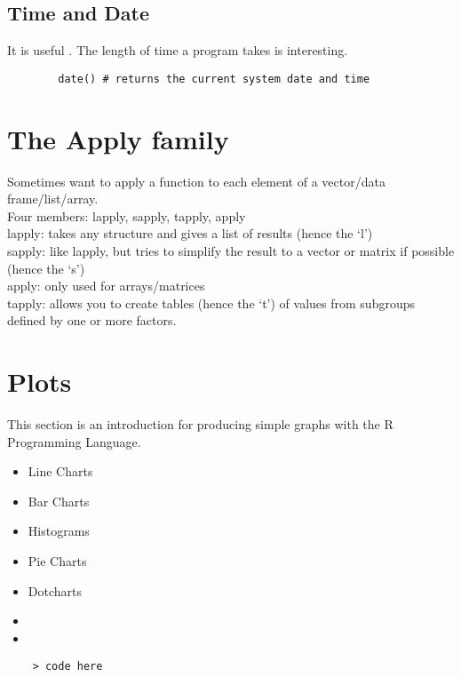 \documentclass[a4paper,12pt]{article}
\begin{document}
\begin{itemize}
	
	\subsection{Time and Date}
	It is useful . The length of time a program takes is interesting.
	
	
	\begin{framed}
		\begin{verbatim}
		date() # returns the current system date and time
		\end{verbatim}
	\end{framed}
	
	
	\section{The Apply family}
	
	Sometimes want to apply a function to each element of a
	vector/data frame/list/array.
	\\
	Four members: lapply, sapply, tapply, apply
	\\
	lapply: takes any structure and gives a list of results (hence
	the `l')
	\\
	sapply: like lapply, but tries to simplify the result to a
	vector or matrix if possible (hence the `s')
	\\
	apply: only used for arrays/matrices
	\\
	tapply: allows you to create tables (hence the `t') of values
	from subgroups defined by one or more factors.
	\newpage
	
	\section{Plots}
	This section is an introduction for producing simple graphs with
	the R Programming Language.
	\begin{itemize}
		\item Line Charts  \item Bar Charts \item Histograms \item Pie
		Charts \item Dotcharts
	\end{itemize}
	
	
	\begin{itemize}
		\item
		\item
	\end{itemize}
	\large \begin{verbatim}
	> code here
	\end{verbatim}\large
	

\end{itemize}
\end{document}
